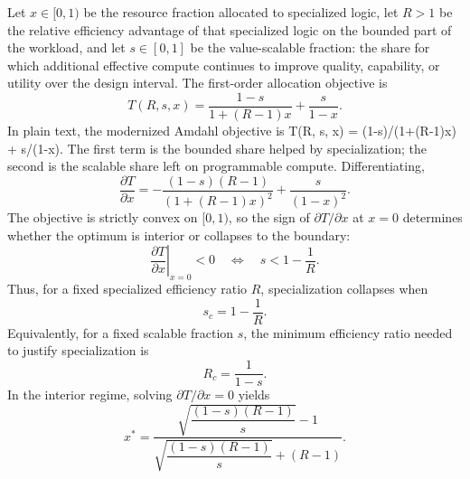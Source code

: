 \documentclass[10pt,journal,onecolumn]{IEEEtran}
\begin{document}
Let $x \in [0,1)$ be the resource fraction allocated to specialized
logic, let $R>1$ be the relative efficiency advantage of that specialized
logic on the bounded part of the workload, and let $s \in [0,1]$ be the
value-scalable fraction: the share for which additional effective
compute continues to improve quality, capability, or utility over the
design interval.  The first-order allocation objective is
\begin{equation}
  T(R,s,x) =
  \frac{1-s}{1+(R-1)x} + \frac{s}{1-x}.
  \label{eq:appendix-allocation}
\end{equation}
In plain text, the modernized Amdahl objective is T(R, s, x) =
(1-s)/(1+(R-1)x) + s/(1-x).
The first term is the bounded share helped by specialization; the second
is the scalable share left on programmable compute.  Differentiating,
\begin{equation}
  \frac{\partial T}{\partial x}
  =
  -\frac{(1-s)(R-1)}{\left(1+(R-1)x\right)^2}
  + \frac{s}{(1-x)^2}.
  \label{eq:appendix-derivative}
\end{equation}
The objective is strictly convex on $[0,1)$, so the sign of
$\partial T/\partial x$ at $x=0$
determines whether the optimum is interior or collapses to the boundary:
\begin{equation}
  \left.\frac{\partial T}{\partial x}\right|_{x=0} < 0
  \quad\Longleftrightarrow\quad
  s < 1 - \frac{1}{R}.
  \label{eq:appendix-threshold}
\end{equation}
Thus, for a fixed specialized efficiency ratio $R$, specialization
collapses when
\begin{equation}
  s_c = 1 - \frac{1}{R}.
  \label{eq:appendix-sc}
\end{equation}
Equivalently, for a fixed scalable fraction $s$, the minimum efficiency
ratio needed to justify specialization is
\begin{equation}
  R_c = \frac{1}{1-s}.
  \label{eq:appendix-rc}
\end{equation}
In the interior regime, solving $\partial T/\partial x=0$ yields
\begin{equation}
  x^*
  =
  \frac{\sqrt{\dfrac{(1-s)(R-1)}{s}} - 1}
       {\sqrt{\dfrac{(1-s)(R-1)}{s}} + (R-1)}.
  \label{eq:appendix-optimum}
\end{equation}
\end{document}
